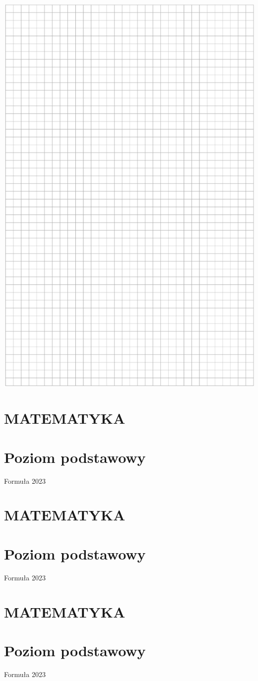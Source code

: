 \documentclass[10pt]{article}
\begin{document}
\includegraphics[max width=\textwidth, center]{2024_11_21_51cb67544fb9b029f01cg-31}

\section*{MATEMATYKA}
\section*{Poziom podstawowy}
Formuła 2023

\section*{MATEMATYKA}
\section*{Poziom podstawowy}
Formuła 2023

\section*{MATEMATYKA}
\section*{Poziom podstawowy}
Formuła 2023
\end{document}
